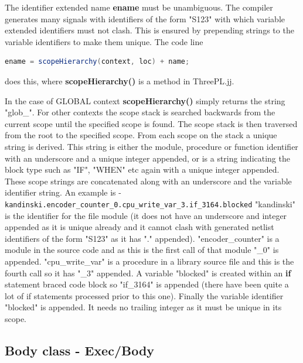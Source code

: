 \documentclass[10pt,a4paper,twoside,fleqn]{book}
\begin{document}
            The identifier extended name {\bf ename} must be unambiguous. The
            compiler generates many signals with identifiers of the form "S123"
            with which variable extended identifiers must not clash. This is ensured
            by prepending strings to the variable identifiers to make them
            unique. The code line
            \begin{lstlisting}[gobble=12, language=java]
                ename = scopeHierarchy(context, loc) + name;
            \end{lstlisting}
            does this, where {\bf scopeHierarchy()} is a method in ThreePL.jj.

            In the case of GLOBAL context {\bf scopeHierarchy()} simply returns
            the string "glob\_". For other contexts the scope stack is searched
            backwards from the current scope until the specified scope is
            found. The scope stack is then traversed from the root to the specified
            scope. From each scope on the stack a unique string is derived. This
            string is either the module, procedure or function identifier with
            an underscore and a unique integer appended, or is a string indicating
            the block type such as "IF", "WHEN" etc again with a unique integer
            appended. These scope strings are concatenated along with an underscore
            and the variable identifier string. An example is -
            \verb'kandinski.encoder_counter_0.cpu_write_var_3.if_3164.blocked'
            "kandinski" is the identifier for the file module (it does not
            have an underscore and integer appended as it is unique already and
            it cannot clash with generated netlist identifiers of the form "S123"
            as it has "." appended). "encoder\_counter" is a module in the
            source code and as this is
            the first call of that module "\_0" is appended. "cpu\_write\_var" is
            a procedure in a library source file and this is the fourth call
            so it has "\_3" appended. A variable "blocked" is created within an
            {\bf if} statement braced code block so "if\_3164" is appended (there
            have been quite a lot of if statements processed prior to this one).
            Finally the variable identifier "blocked" is appended. It needs no
            trailing integer as it must be unique in its scope.




        \subsection{Body class - Exec/Body}\label{body}
\end{document}
